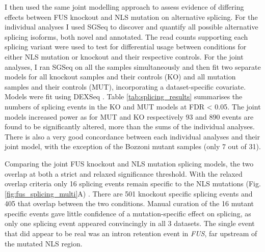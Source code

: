 I then used the same joint modelling approach to assess evidence of differing effects between FUS knockout and NLS mutation on alternative splicing.
For the individual analyses I used SGSeq \citep{Goldstein2016} to discover and quantify all possible alternative splicing isoforms, both novel and annotated. 
The read counts supporting each splicing variant were used to test for differential usage between conditions for either NLS mutation or knockout and their respective controls.
For the joint analyses, I ran SGSeq on all the samples simultaneously and then fit two separate models for all knockout samples and their controls (KO) and all mutation samples and their controls (MUT), incorporating a dataset-specific covariate. 
Models were fit using DEXSeq \citep{Anders2012}.
Table \ref{tab:splicing_results} summarises the numbers of splicing events in the KO and MUT models at FDR < 0.05.
The joint models increased power as for MUT and KO respectively 93 and 890 events are found to be significantly altered, more than the sums of the individual analyses.
There is also a very good concordance between each individual analyses and their joint model, with the exception of the Bozzoni mutant samples (only 7 out of 31).

Comparing the joint FUS knockout and NLS mutation splicing models, the two overlap at both a strict and relaxed significance threshold.
With the relaxed overlap criteria only 16 splicing events remain specific to the NLS mutations (Fig. \ref{fig:fus_splicing_multi}A) .
There are 501 knockout specific splicing events and 405 that overlap between the two conditions.
Manual curation of the 16 mutant specific events gave little confidence of a mutation-specific effect on splicing, as only one splicing event appeared convincingly in all 3 datasets.
The single event that did appear to be real was an intron retention event in \textit{FUS}, far upstream of the mutated NLS region.

